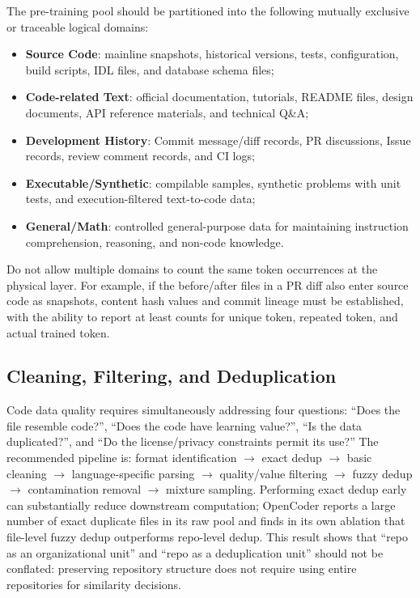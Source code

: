 \documentclass[10pt,a4paper,UTF8,fontset=none]{ctexart}
\begin{document}
The pre-training pool should be partitioned into the following mutually exclusive or traceable logical domains:

\begin{itemize}
  \item \textbf{Source Code}: mainline snapshots, historical versions, tests, configuration, build scripts, IDL files, and database schema files;
  \item \textbf{Code-related Text}: official documentation, tutorials, README files, design documents, API reference materials, and technical Q\&A;
  \item \textbf{Development History}: Commit message/diff records, PR discussions, Issue records, review comment records, and CI logs;
  \item \textbf{Executable/Synthetic}: compilable samples, synthetic problems with unit tests, and execution-filtered text-to-code data;
  \item \textbf{General/Math}: controlled general-purpose data for maintaining instruction comprehension, reasoning, and non-code knowledge.
\end{itemize}

Do not allow multiple domains to count the same token occurrences at the physical layer. For example, if the before/after files in a PR diff also enter source code as snapshots, content hash values and commit lineage must be established, with the ability to report at least counts for unique token, repeated token, and actual trained token.

\subsection{Cleaning, Filtering, and Deduplication}

Code data quality requires simultaneously addressing four questions: ``Does the file resemble code?'', ``Does the code have learning value?'', ``Is the data duplicated?'', and ``Do the license/privacy constraints permit its use?'' The recommended pipeline is: format identification $\rightarrow$ exact dedup $\rightarrow$ basic cleaning $\rightarrow$ language-specific parsing $\rightarrow$ quality/value filtering $\rightarrow$ fuzzy dedup $\rightarrow$ contamination removal $\rightarrow$ mixture sampling. Performing exact dedup early can substantially reduce downstream computation; OpenCoder reports a large number of exact duplicate files in its raw pool and finds in its own ablation that file-level fuzzy dedup outperforms repo-level dedup\cite{huang2024opencoder}. This result shows that ``repo as an organizational unit'' and ``repo as a deduplication unit'' should not be conflated: preserving repository structure does not require using entire repositories for similarity decisions.
\end{document}
